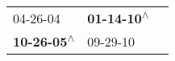 \begin{supertabular}{lll}
                  04-26-04\textsuperscript{} &  \textbf{01-14-10\textsuperscript{$\wedge$}} \\
 \textbf{10-26-05\textsuperscript{$\wedge$}} &                   09-29-10\textsuperscript{} \\
\end{supertabular}

